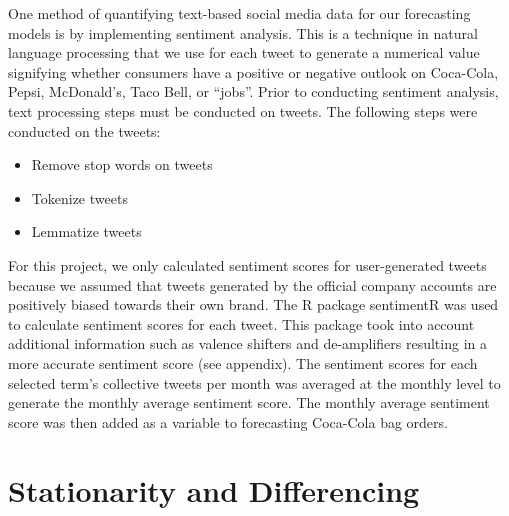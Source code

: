 \documentclass[12pt,oneside]{chicagocapstone}
\providecommand{\tightlist}{%
  \setlength{\itemsep}{0pt}\setlength{\parskip}{0pt}}
\begin{document}
One method of quantifying text-based social media data for our forecasting models is by implementing sentiment analysis. This is a technique in natural language processing that we use for each tweet to generate a numerical value signifying whether consumers have a positive or negative outlook on Coca-Cola, Pepsi, McDonald's, Taco Bell, or ``jobs''. Prior to conducting sentiment analysis, text processing steps must be conducted on tweets. The following steps were conducted on the tweets:
\begin{itemize}
\tightlist
\item
  Remove stop words on tweets
\item
  Tokenize tweets
\item
  Lemmatize tweets
\end{itemize}
For this project, we only calculated sentiment scores for user-generated tweets because we assumed that tweets generated by the official company accounts are positively biased towards their own brand. The R package sentimentR was used to calculate sentiment scores for each tweet. This package took into account additional information such as valence shifters and de-amplifiers resulting in a more accurate sentiment score (see appendix). The sentiment scores for each selected term's collective tweets per month was averaged at the monthly level to generate the monthly average sentiment score. The monthly average sentiment score was then added as a variable to forecasting Coca-Cola bag orders.

\hypertarget{stationarity-and-differencing}{%
\section*{Stationarity and Differencing}\label{stationarity-and-differencing}}
\end{document}
